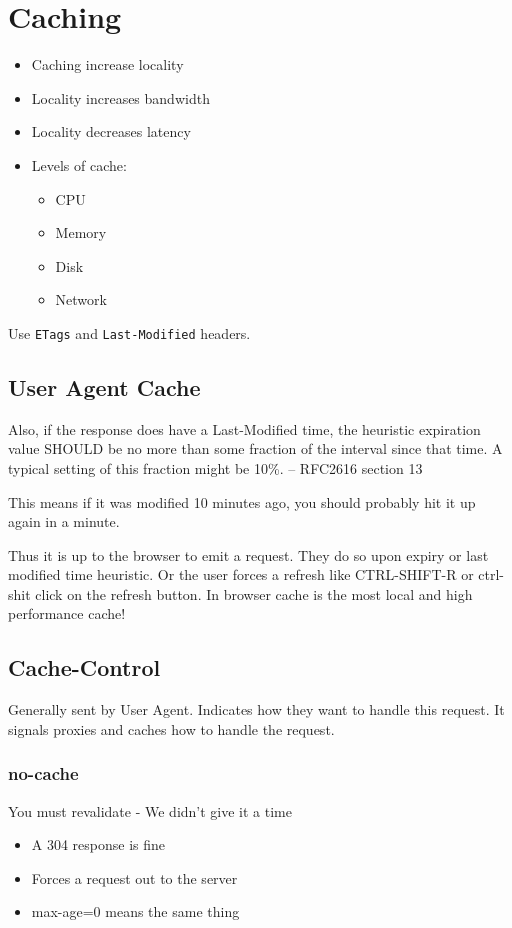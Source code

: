 \documentclass[../CMPUT-404-Notes.tex]{subfiles}
\begin{document}
\section{Caching}
\begin{itemize}
    \item Caching increase locality
    \item Locality increases bandwidth
    \item Locality decreases latency
    \item Levels of cache:
    \begin{itemize}
        \item CPU
        \item Memory
        \item Disk
        \item Network
    \end{itemize}
\end{itemize}
Use \texttt{ETags} and \texttt{Last-Modified} headers.

\subsection{User Agent Cache}
\begin{quotebox}
    Also, if the response does have a Last-Modified
    time, the heuristic expiration value SHOULD be
    no more than some fraction of the interval since
    that time. A typical setting of this fraction might
    be 10\%. – RFC2616 section 13
\end{quotebox}
This means if it was modified 10 minutes ago, you should probably hit it up again in a minute.

Thus it is up to the browser to emit a request.
They do so upon expiry or last modified time heuristic.
Or the user forces a refresh like CTRL-SHIFT-R or ctrl-shit click on the refresh button.
In browser cache is the most local and high performance cache!

\subsection{Cache-Control}
Generally sent by User Agent.
Indicates how they want to handle this request.
It signals proxies and caches how to handle the request.

\subsubsection{no-cache}
You must revalidate - We didn't give it a time
\begin{itemize}
    \item A 304 response is fine
    \item Forces a request out to the server
    \item max-age=0 means the same thing
\end{itemize}
\end{document}
